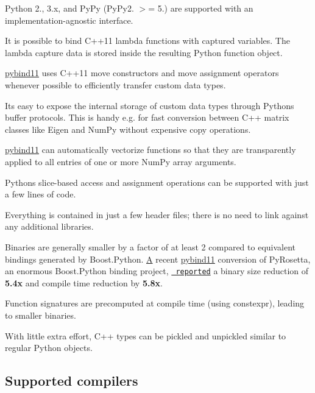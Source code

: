 \begin{DoxyItemize}
\item Python 2., 3.\+x, and Py\+Py (Py\+Py2. $>$= 5.) are supported with an implementation-\/agnostic interface.
\item It is possible to bind C++11 lambda functions with captured variables. The lambda capture data is stored inside the resulting Python function object.
\item \mbox{\hyperlink{namespacepybind11}{pybind11}} uses C++11 move constructors and move assignment operators whenever possible to efficiently transfer custom data types.
\item It\textquotesingle{}s easy to expose the internal storage of custom data types through Pythons\textquotesingle{} buffer protocols. This is handy e.\+g. for fast conversion between C++ matrix classes like Eigen and Num\+Py without expensive copy operations.
\item \mbox{\hyperlink{namespacepybind11}{pybind11}} can automatically vectorize functions so that they are transparently applied to all entries of one or more Num\+Py array arguments.
\item Python\textquotesingle{}s slice-\/based access and assignment operations can be supported with just a few lines of code.
\item Everything is contained in just a few header files; there is no need to link against any additional libraries.
\item Binaries are generally smaller by a factor of at least 2 compared to equivalent bindings generated by Boost.\+Python. \mbox{\hyperlink{struct_a}{A}} recent \mbox{\hyperlink{namespacepybind11}{pybind11}} conversion of Py\+Rosetta, an enormous Boost.\+Python binding project, \href{http://graylab.jhu.edu/RosettaCon2016/PyRosetta-4.pdf}{\texttt{ reported}} a binary size reduction of {\bfseries{5.\+4x}} and compile time reduction by {\bfseries{5.\+8x}}.
\item Function signatures are precomputed at compile time (using {\ttfamily constexpr}), leading to smaller binaries.
\item With little extra effort, C++ types can be pickled and unpickled similar to regular Python objects.
\end{DoxyItemize}

\subsection*{Supported compilers}


